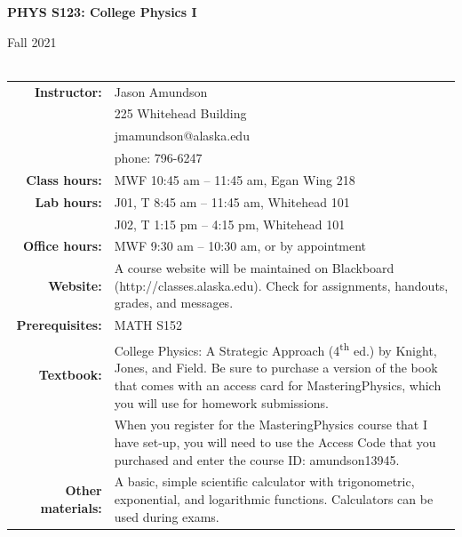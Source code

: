 \documentclass[11pt,letterpaper]{article}
\newcommand{\squeezeup}{\vspace{-2.5mm}}
\newcommand{\tablespace}[0]{\vspace{8pt}}
\begin{document}
\begin{centering}
\textbf{PHYS S123: College Physics I}

Fall 2021\\
\hspace{1cm}\\

\bigskip
\begin{table}[h]
\centering
\setlength{\extrarowheight}{2pt}
\squeezeup
\begin{tabular}{@{}r@{\hspace{0.1in}}p{4.25in}} 
{\bf Instructor:} & Jason Amundson\\
& 225 Whitehead Building\\
& jmamundson@alaska.edu\\
& phone: 796-6247 \tablespace\\
{\bf Class hours:} & MWF 10:45 am -- 11:45 am, Egan Wing 218\tablespace\\
{\bf Lab hours:} & J01, T 8:45 am -- 11:45 am, Whitehead 101\\
& J02, T 1:15 pm -- 4:15 pm, Whitehead 101\tablespace\\
{\bf Office hours:} & MWF 9:30 am -- 10:30 am, or by appointment\tablespace\\
{\bf Website:} & A course website will be maintained on Blackboard (http://classes.alaska.edu). Check for assignments, handouts, grades, and messages.\tablespace\\
{\bf Prerequisites:} & MATH S152\tablespace\\
{\bf Textbook:} & College Physics: A Strategic Approach (4\textsuperscript{th} ed.) by Knight, Jones, and Field. Be sure to purchase a version of the book that comes with an access card for MasteringPhysics, which you will use for homework submissions.
\tablespace\\
& When you register for the MasteringPhysics course that I have set-up, you will need to use the Access Code that you purchased and enter the course ID: amundson13945.\tablespace\\
{\bf Other materials:} & A basic, simple scientific calculator with trigonometric, exponential, and logarithmic functions. Calculators can be used during exams.
\end{tabular}
\end{table}
\end{centering}
\end{document}
